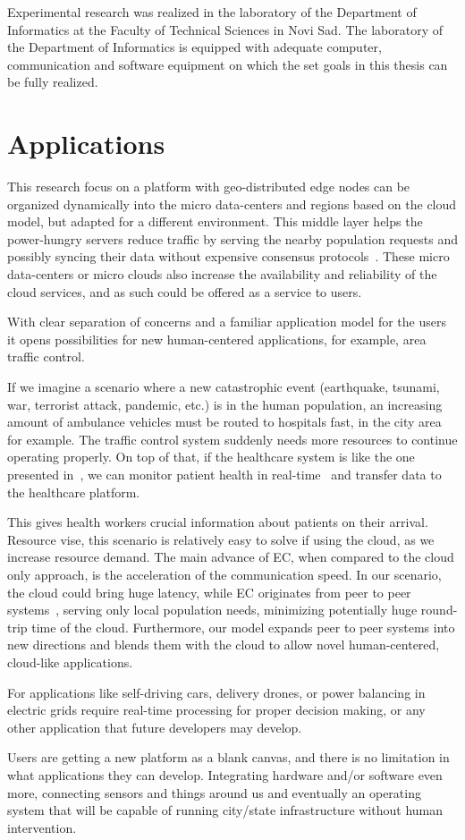 Experimental research was realized in the laboratory of the Department of Informatics at the Faculty of Technical Sciences in Novi Sad. The laboratory of the Department of Informatics is equipped with adequate computer, communication and software equipment on which the set goals in this thesis can be fully realized.
%
%
\section{Applications}\label{sec:app}
%
This research focus on a platform with geo-distributed edge nodes can be organized dynamically into the micro data-centers and regions based on the cloud model, but adapted for a different environment. This middle layer helps the power-hungry servers reduce traffic by serving the nearby population requests and possibly syncing their data without expensive consensus protocols~\cite{inproceedingsSimic2}. These micro data-centers or micro clouds also increase the availability and reliability of the cloud services, and as such could be offered as a service to users.

With clear separation of concerns and a familiar application model for the users it opens possibilities for new human-centered applications, for example, area traffic control. 

If we imagine a scenario where a new catastrophic event (earthquake, tsunami, war, terrorist attack, pandemic, etc.) is in the human population, an increasing amount of ambulance vehicles must be routed to hospitals fast, in the city area for example. The traffic control system suddenly needs more resources to continue operating properly. On top of that, if the healthcare system is like the one presented in~\cite{OmarBBKR19, inproceedingsSimic5}, we can monitor patient health in real-time~\cite{Al-KhafajiyBCAK19} and transfer data to the healthcare platform. 

This gives health workers crucial information about patients on their arrival. Resource vise, this scenario is relatively easy to solve if using the cloud, as we increase resource demand. The main advance of EC, when compared to the cloud only approach, is the acceleration of the communication speed. In our scenario, the cloud could bring huge latency, while EC originates from peer to peer systems~\cite{LopezMEDHIBFR15}, serving only local population needs, minimizing potentially huge round-trip time of the cloud. Furthermore, our model expands peer to peer systems into new directions and blends them with the cloud to allow novel human-centered, cloud-like applications. 

For applications like self-driving cars, delivery drones, or power balancing in electric grids require real-time processing for proper decision making, or any other application that future developers may develop.

Users are getting a new platform as a blank canvas, and there is no limitation in what applications they can develop. Integrating hardware and/or software even more, connecting sensors and things around us and eventually an operating system that will be capable of running city/state infrastructure without human intervention.
%
%